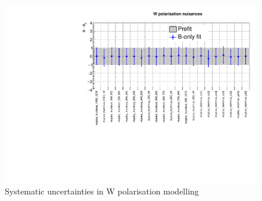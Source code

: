 \clearpage
\begin{figure}[h!]
  \centering
  \caption{Systematic uncertainties in W polarisation modelling}
  \includegraphics[width=0.8\linewidth]{figures/results/36invfb_approval/postfit/nuis/WPol_nuisances}
\end{figure}
